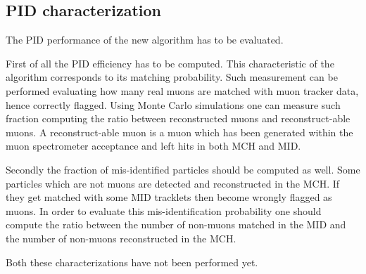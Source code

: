 \subsection{PID characterization}
The PID performance of the new algorithm has to be evaluated.

First of all the PID efficiency has to be computed.
This characteristic of the algorithm corresponds to its matching probability.
Such measurement can be performed evaluating how many real muons are matched with muon tracker data, hence correctly flagged.
Using Monte Carlo simulations one can measure such fraction computing the ratio between reconstructed muons and reconstruct-able muons.
A reconstruct-able muon is a muon which has been generated within the muon spectrometer acceptance and left hits in both MCH and MID.

Secondly the fraction of mis-identified particles should be computed as well.
Some particles which are not muons are detected and reconstructed in the MCH.
If they get matched with some MID tracklets then become wrongly flagged as muons.
In order to evaluate this mis-identification probability one should compute the ratio between the number of non-muons matched in the MID and the number of non-muons reconstructed in the MCH.

Both these characterizations have not been performed yet.

